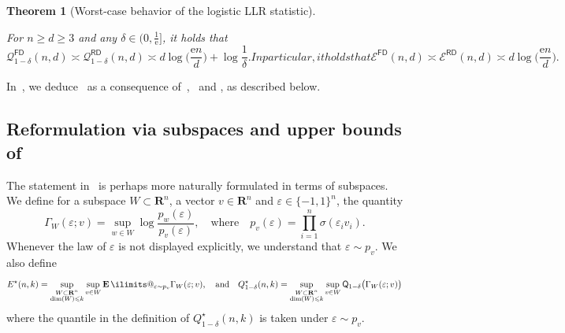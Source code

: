 \documentclass[11pt, letterpaper, hidelinks]{article}
\makeatletter
\newcommand{\R}{\mathbf R}
\newcommand{\cE}{\mathcal{E}}
\newcommand{\cQ}{\mathcal{Q}}
\newcommand{\e}{\mathrm{e}}
\newcommand{\1}{\mathbf 1}
\newcommand{\eps}{\varepsilon}
\renewcommand{\leq}{\leqslant}
\renewcommand{\geq}{\geqslant}
\newcommand{\E}{\operatorname*{\mathbf{E}}\ilimits@}
\theoremstyle{plain}
\newtheorem{theorem}{Theorem}[section]
\theoremstyle{definition}
\newcommand{\Quant}[1]{\mathsf{Q}_{#1}}
\newcommand{\FD}{\mathsf{FD}}
\newcommand{\RD}{\mathsf{RD}}
\newcommand{\WorstCaseFixedDesign}[2]{\cE^\FD(#1,#2)}
\newcommand{\WorstCaseRandomDesign}[2]{\cE^\RD(#1,#2)}
\newcommand{\WorstCaseFixedDesignQuant}[3]{\cQ_{#1}^\FD(#2,#3)}
\newcommand{\WorstCaseRandomDesignQuant}[3]{\cQ_{#1}^\RD(#2,#3)}
\makeatother
\begin{document}
\begin{theorem}[Worst-case behavior of the logistic LLR statistic]
\label{thm:main-result}

For $n \geq d \geq 3$ and any $\delta \in (0, \tfrac{1}{\e}]$, it holds that
\begin{subequations}
\begin{equation}
\label{eqn:main-worst-case-result-quantile}
\WorstCaseFixedDesignQuant{1-\delta}{n}{d}
\asymp
\WorstCaseRandomDesignQuant{1-\delta}{n}{d}
\asymp d \log \Big(\frac{\e n}{d}\Big) + \log\frac{1}{\delta}.
\end{equation}
In particular, it holds that
\begin{equation}
\label{eqn:main-worst-case-result-expected}
\WorstCaseFixedDesign{n}{d}
\asymp
\WorstCaseRandomDesign{n}{d}
\asymp
d \log \Big(\frac{\e n}{d}\Big).
\end{equation}
\end{subequations}
\end{theorem}

\noindent In~, we  deduce~ as a consequence of~,~ and , as described below.


\subsection{Reformulation via subspaces and upper bounds of }

The statement in~ is perhaps more naturally formulated in terms of subspaces. We define for a subspace $W \subset \R^n$, a vector $v \in \R^n$ and $\eps \in \{-1,1\}^n$, the quantity
\begin{equation}
\label{eq:subspace-reformulation}
\Gamma_W(\eps; v)
	= \sup_{w \in W} \log \frac{p_w(\eps)}{p_v(\eps)},
		\quad \mbox{where} \quad
	p_v(\eps) = \prod_{i=1}^n \sigma(\eps_i v_i).
\end{equation}
Whenever the law of $\eps$ is not displayed explicitly, we understand that $\eps\sim p_v$.
We also define 
\begin{equation}
\label{eqn:definition-of-largest-subspace-LLR}
E^\star(n,k) = 
\sup_{\substack{W \subset \R^n\\ \dim(W) \leq k}} \sup_{v \in W} \E_{\eps \sim p_v} \Gamma_W(\eps; v), 
\quad \mbox{and} \quad 
Q^\star_{1-\delta}(n,k) = 
\sup_{\substack{W \subset \R^n\\ \dim(W) \leq k}} \sup_{v \in W} \Quant{1-\delta}\big(\Gamma_W(\eps; v)\big)
\end{equation}
where the quantile in the definition of $Q^\star_{1-\delta}(n,k)$ is taken under $\eps\sim p_v$.
\end{document}

